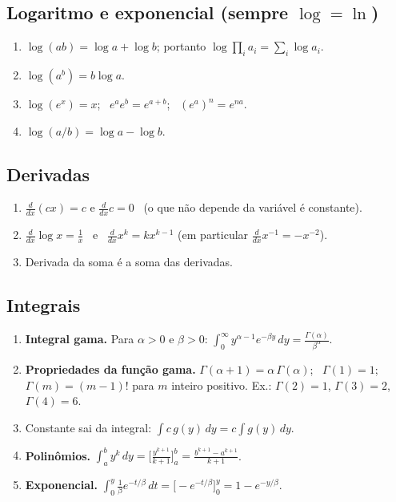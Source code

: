 \documentclass[11pt,a4paper]{article}
\theoremstyle{definition}
\theoremstyle{plain}
\begin{document}
\subsection*{Logaritmo e exponencial (sempre $\log=\ln$)}
\begin{enumerate}[label=\textbf{(L\arabic*)},leftmargin=3.2em]
\item $\log(ab)=\log a+\log b$; portanto $\log\prod_i a_i=\sum_i\log a_i$.
\item $\log(a^b)=b\log a$.
\item $\log(e^x)=x$; \ $e^ae^b=e^{a+b}$; \ $(e^a)^n=e^{na}$.
\item $\log(a/b)=\log a-\log b$.
\end{enumerate}

\subsection*{Derivadas}
\begin{enumerate}[label=\textbf{(D\arabic*)},leftmargin=3.2em]
\item $\frac{d}{dx}(cx)=c$ e $\frac{d}{dx}c=0$ \ (o que não depende da variável é constante).
\item $\frac{d}{dx}\log x=\frac1x$ \ e \ $\frac{d}{dx}x^{k}=kx^{k-1}$ (em particular $\frac{d}{dx}x^{-1}=-x^{-2}$).
\item Derivada da soma é a soma das derivadas.
\end{enumerate}

\subsection*{Integrais}
\begin{enumerate}[label=\textbf{(I\arabic*)},leftmargin=3.2em]
\item \textbf{Integral gama.} Para $\alpha>0$ e $\beta>0$: $\displaystyle\int_0^\infty y^{\alpha-1}e^{-\beta y}\,dy=\frac{\Gamma(\alpha)}{\beta^\alpha}$.
\item \textbf{Propriedades da função gama.} $\Gamma(\alpha+1)=\alpha\,\Gamma(\alpha)$; \ $\Gamma(1)=1$; \ $\Gamma(m)=(m-1)!$ para $m$ inteiro positivo. Ex.: $\Gamma(2)=1$, $\Gamma(3)=2$, $\Gamma(4)=6$.
\item Constante sai da integral: $\int c\,g(y)\,dy=c\int g(y)\,dy$.
\item \textbf{Polinômios.} $\int_a^b y^k\,dy=\Big[\frac{y^{k+1}}{k+1}\Big]_a^b=\frac{b^{k+1}-a^{k+1}}{k+1}$.
\item \textbf{Exponencial.} $\int_0^y \frac1\beta e^{-t/\beta}\,dt=\Big[-e^{-t/\beta}\Big]_0^y=1-e^{-y/\beta}$.
\end{enumerate}
\end{document}
